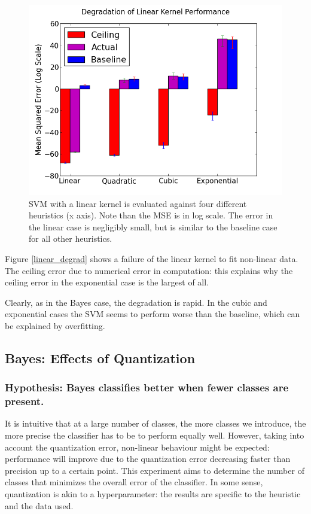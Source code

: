 \documentclass[12pt,notitlepage,twoside]{scrreprt}
\begin{document}
\begin{figure}[h!]
\centering
  \includegraphics[width=\linewidth]{figs/lin_degrad.png}
  \caption{SVM with a linear kernel is evaluated against four different heuristics (x
  axis). Note than the MSE is in log scale. The error in the linear case is negligibly
  small, but is similar to the baseline case for all other heuristics. \label{lin_degrad}}
\end{figure}

Figure \ref{linear_degrad} shows a failure of the linear kernel to fit non-linear data.
The ceiling error due to numerical error in computation: this explains why the ceiling
error in the exponential case is the largest of all. 

Clearly, as in the Bayes case, the degradation is rapid. In the cubic and exponential
cases the SVM seems to perform worse than the baseline, which can be explained by
overfitting.
\subsection{Bayes: Effects of Quantization}
\subsubsection{Hypothesis: Bayes classifies better when fewer classes are present.}
It is intuitive that at a large number of classes, the more classes we introduce, the more
precise the classifier has to be to perform equally well. However, taking into account the
quantization error, non-linear behaviour might be expected: performance will improve due to
the quantization error decreasing faster than precision up to a certain point. This
experiment aims to determine the number of classes that minimizes the overall error of the
classifier. In some sense, quantization is akin to a hyperparameter: the results are
specific to the heuristic and the data used.
\end{document}
